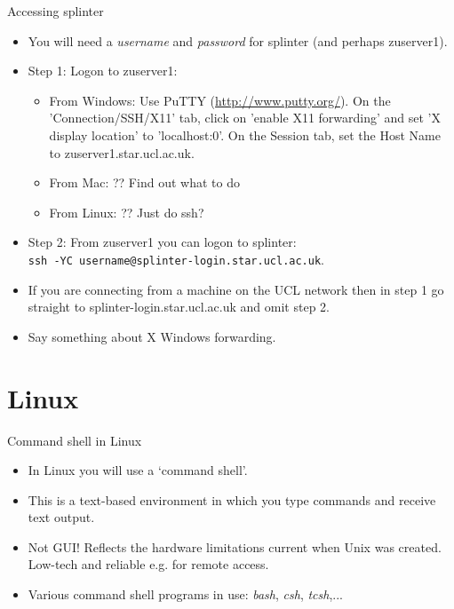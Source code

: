 \documentclass{beamer}
\begin{document}
\begin{frame}{Accessing splinter}
  \begin{itemize}
  \item You will need a \textit{username} and \textit{password} for splinter (and perhaps zuserver1).
  \item Step 1: Logon to zuserver1:
    \begin{itemize}
    \item From Windows: Use PuTTY (\url{http://www.putty.org/}). On the 'Connection/SSH/X11' tab, click on 'enable X11 forwarding' and set 'X display location' to 'localhost:0'. On the Session tab, set the Host Name to zuserver1.star.ucl.ac.uk.
    \item From Mac: ?? Find out what to do
    \item From Linux: ?? Just do ssh?
    \end{itemize}
  \item Step 2: From zuserver1 you can logon to splinter: \\ \texttt{ssh -YC username@splinter-login.star.ucl.ac.uk}.
  \item If you are connecting from a machine on the UCL network then in step 1 go straight to splinter-login.star.ucl.ac.uk and omit step 2.
  \item Say something about X Windows forwarding.
  \end{itemize}
\end{frame}


\section{Linux}

\begin{frame}{Command shell in Linux}
  \begin{itemize}
    \item{In Linux you will use a `command shell'.}
    \item{This is a text-based environment in which you type commands and receive text output.}
    \item{Not GUI! Reflects the hardware limitations current when Unix was created. Low-tech and reliable e.g. for remote access.}
    \item{Various command shell programs in use: \textit{bash}, \textit{csh}, \textit{tcsh},...}
   \end{itemize}
\end{frame}
\end{document}
